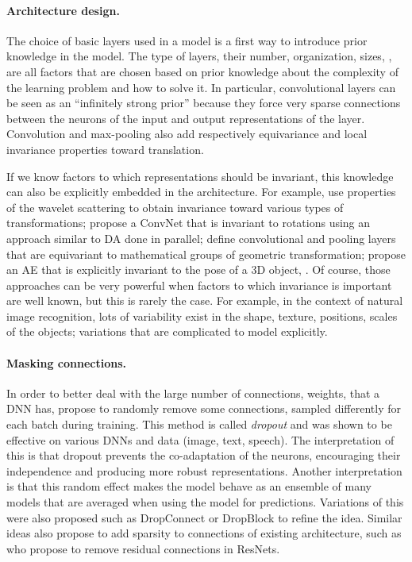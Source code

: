 \paragraph{Architecture design.}
The choice of basic layers used in a model is a first way to introduce prior knowledge in the model. The type of layers, their number, organization, sizes, \etc, are all factors that are chosen based on prior knowledge about the complexity of the learning problem and how to solve it. In particular, convolutional layers can be seen as an ``infinitely strong prior'' \citep[chapter 9]{GoodfellowDL} because they force very sparse connections between the neurons of the input and output representations of the layer. Convolution and max-pooling also add respectively equivariance and local invariance properties toward translation.

If we know factors to which representations should be invariant, this knowledge can also be explicitly embedded in the architecture. For example, \citet{Mallat2011,bruna} use properties of the wavelet scattering to obtain invariance toward various types of transformations; \citet{dieleman2015rotation} propose a \ac{ConvNet} that is invariant to rotations using an approach similar to \ac{DA} done in parallel; \citet{cohen2016group} define convolutional and pooling layers that are equivariant to mathematical groups of geometric transformation; \citet{mehr2018} propose an \ac{AE} that is explicitly invariant to the pose of a 3D object, \etc. 
Of course, those approaches can be very powerful when factors to which invariance is important are well known, but this is rarely the case. For example, in the context of natural image recognition, lots of variability exist in the shape, texture, positions, scales of the objects; variations that are complicated to model explicitly.

\paragraph{Masking connections.}
In order to better deal with the large number of connections, \ie weights, that a \ac{DNN} has, \citet{dropout} propose to randomly remove some connections, sampled differently for each batch during training. This method is called \textit{dropout} and was shown to be effective on various \acp{DNN} and data (image, text, speech). The interpretation of this is that dropout prevents the co-adaptation of the neurons, encouraging their independence and producing more robust representations. Another interpretation is that this random effect makes the model behave as an ensemble of many models that are averaged when using the model for predictions. Variations of this were also proposed such as DropConnect \citep{dropconnect} or DropBlock \citep{ghiasi2018dropblock} to refine the idea. Similar ideas also propose to add sparsity to connections of existing architecture, such as \citet{zhu2018sparsely} who propose to remove residual connections in ResNets.

